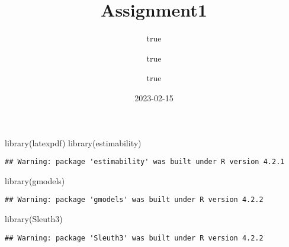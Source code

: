 \documentclass[
]{article}
\title{Assignment1}
\author{true \and true \and true}
\date{2023-02-15}
\newenvironment{Shaded}{\begin{snugshade}}{\end{snugshade}}
\newcommand{\AttributeTok}[1]{\textcolor[rgb]{0.77,0.63,0.00}{#1}}
\newcommand{\DecValTok}[1]{\textcolor[rgb]{0.00,0.00,0.81}{#1}}
\newcommand{\FunctionTok}[1]{\textcolor[rgb]{0.00,0.00,0.00}{#1}}
\newcommand{\NormalTok}[1]{#1}
\newcommand{\OtherTok}[1]{\textcolor[rgb]{0.56,0.35,0.01}{#1}}
\newcommand{\SpecialCharTok}[1]{\textcolor[rgb]{0.00,0.00,0.00}{#1}}
\begin{document}
\maketitle

\begin{Shaded}
\begin{Highlighting}[]
\FunctionTok{library}\NormalTok{(latexpdf)}
\FunctionTok{library}\NormalTok{(estimability)}
\end{Highlighting}
\end{Shaded}

\begin{verbatim}
## Warning: package 'estimability' was built under R version 4.2.1
\end{verbatim}

\begin{Shaded}
\begin{Highlighting}[]
\FunctionTok{library}\NormalTok{(gmodels)}
\end{Highlighting}
\end{Shaded}

\begin{verbatim}
## Warning: package 'gmodels' was built under R version 4.2.2
\end{verbatim}

\begin{Shaded}
\begin{Highlighting}[]
\FunctionTok{library}\NormalTok{(Sleuth3)}
\end{Highlighting}
\end{Shaded}

\begin{verbatim}
## Warning: package 'Sleuth3' was built under R version 4.2.2
\end{verbatim}

\begin{Shaded}
\end{Shaded}
\end{document}
